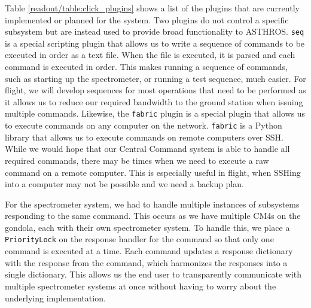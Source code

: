 Table \ref{readout/table:click_plugins} shows a list of the plugins that are currently implemented or planned for the system.
Two plugins do not control a specific subsystem but are instead used to provide broad functionality to ASTHROS.
\texttt{seq} is a special scripting plugin that allows us to write a sequence of commands to be executed in order as a text file. 
When the file is executed, it is parsed and each command is executed in order.
This makes running a sequence of commands, such as starting up the spectrometer, or running a test sequence, much easier.
For flight, we will develop sequences for most operations that need to be performed as it allows us to reduce our required bandwidth to the ground station when issuing multiple commands. 
Likewise, the \texttt{fabric} plugin is a special plugin that allows us to execute commands on any computer on the network.
\texttt{fabric} is a Python library that allows us to execute commands on remote computers over SSH. 
While we would hope that our Central Command system is able to handle all required commands, there may be times when we need to execute a raw command on a remote computer.
This is especially useful in flight, when SSHing into a computer may not be possible and we need a backup plan.

For the spectrometer system, we had to handle multiple instances of subsystems responding to the same command.
This occurs as we have multiple CM4s on the gondola, each with their own spectrometer system.
To handle this, we place a \texttt{PriorityLock} on the response handler for the command so that only one command is executed at a time.
Each command updates a response dictionary with the response from the command, which harmonizes the responses into a single dictionary.
This allows us the end user to transparently communicate with multiple spectrometer systems at once without having to worry about the underlying implementation.